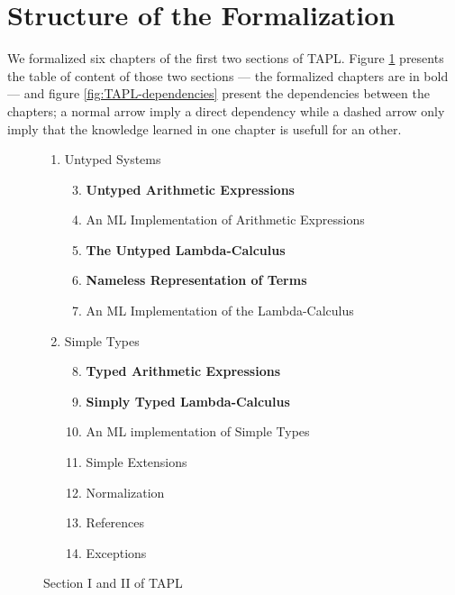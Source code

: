 \section{Structure of the Formalization}
\label{sec:structure-of-formalization}

We formalized six chapters of the first two sections of TAPL. Figure \ref{fig:TAPL-toc} presents the
table of content of those two sections --- the formalized chapters are in bold --- and figure
\ref{fig:TAPL-dependencies} present the dependencies between the chapters; a normal arrow imply a
direct dependency while a dashed arrow only imply that the knowledge learned in one chapter is
usefull for an other.

\begin{figure}[h]
  \footnotesize
  \centering
  \begin{varwidth}{\textwidth}
    \begin{enumerate}[label=\Roman*]
      \itemsep 1pt
      \item Untyped Systems \hfill
        \begin{enumerate}[label=§ \arabic*]
          \setcounter{enumii}{2}
          \item \textbf{Untyped Arithmetic Expressions}
          \item An ML Implementation of Arithmetic Expressions
          \item \textbf{The Untyped Lambda-Calculus}
          \item \textbf{Nameless Representation of Terms}
          \item An ML Implementation of the Lambda-Calculus
        \end{enumerate}
      \item Simple Types \hfill
        \begin{enumerate}[label=§ \arabic*]
          \setcounter{enumii}{7}
          \item \textbf{Typed Arithmetic Expressions}
          \item \textbf{Simply Typed Lambda-Calculus}
          \item An ML implementation of Simple Types
          \item Simple Extensions
          \item Normalization
          \item References
          \item Exceptions
        \end{enumerate}
    \end{enumerate}
  \end{varwidth}
  \caption{Section I and II of TAPL}
  \label{fig:TAPL-toc}
\end{figure}

